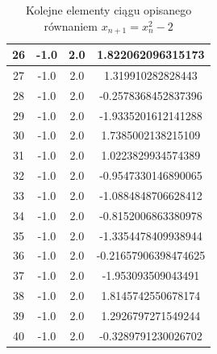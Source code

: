 \documentclass{article}
\begin{document}
\begin{table}[h!]
\begin{tabular}{ |c|c|c|c| }
    \hline
    26 & -1.0 & 2.0 & 1.822062096315173 \\
    \hline
    27 & -1.0 & 2.0 & 1.319910282828443 \\
    \hline
    28 & -1.0 & 2.0 & -0.2578368452837396 \\
    \hline
    29 & -1.0 & 2.0 & -1.9335201612141288 \\
    \hline
    30 & -1.0 & 2.0 & 1.7385002138215109 \\
    \hline
    31 & -1.0 & 2.0 & 1.0223829934574389 \\
    \hline
    32 & -1.0 & 2.0 & -0.9547330146890065 \\
    \hline
    33 & -1.0 & 2.0 & -1.0884848706628412 \\
    \hline
    34 & -1.0 & 2.0 & -0.8152006863380978 \\
    \hline
    35 & -1.0 & 2.0 & -1.3354478409938944 \\
    \hline
    36 & -1.0 & 2.0 & -0.21657906398474625 \\
    \hline
    37 & -1.0 & 2.0 & -1.953093509043491 \\
    \hline
    38 & -1.0 & 2.0 & 1.8145742550678174 \\
    \hline
    39 & -1.0 & 2.0 & 1.2926797271549244 \\
    \hline
    40 & -1.0 & 2.0 & -0.3289791230026702 \\
    \hline
    \end{tabular}
    \caption{Kolejne elementy ciągu opisanego równaniem $x_{n+1} = x_n^2 - 2$}
\end{table}
\end{document}
